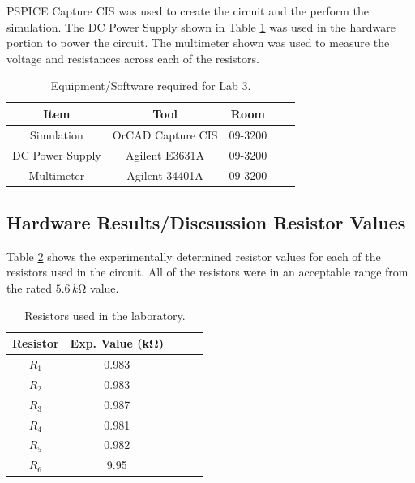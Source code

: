 \documentclass[11pt]{article}
\begin{document}
PSPICE Capture CIS was used to create the circuit and the perform the simulation. The DC Power Supply shown in Table \ref{Table:Equipment} was used in the hardware portion to power the circuit. The multimeter shown was used to measure the voltage and resistances across each of the resistors.

\begin{table}[htbp]
	\setlength{\tabcolsep}{14pt}
	\caption{Equipment/Software required for Lab 3.}
	\label{Table:Equipment}
	\begin{center}
		\begin{tabular}{|c||c|c|c|c|}
			\hline
			Item & Tool & Room      \\
			\hline
			Simulation & OrCAD Capture CIS & 09-3200   \\
			\hline  
			DC Power Supply & Agilent E3631A   & 09-3200 \\ 
			\hline 
			Multimeter & Agilent 34401A & 09-3200 \\
			\hline
		\end{tabular}
	\end{center}
\end{table}

\subsection{Hardware Results/Discsussion Resistor Values}	

Table \ref{Table:Lab3Resistors} shows the experimentally determined resistor values for each of the resistors used in the circuit. All of the resistors were in an acceptable range from the rated $5.6\,k\si\ohm$ value.

  	\begin{table}[h!]
  		\centering
  		\caption{Resistors used in the laboratory.}
  		\label{Table:Lab3Resistors}
  		\begin{tabular}{|c||c|c|c|c|}
  			\hline
  			Resistor &Exp. Value (\si{\kilo\ohm})  \\
  			\hline
  			$R_{1}$  & 0.983 \\	 \hline 
  			$R_{2}$  & 0.983 \\	 \hline 
  			$R_{3}$  & 0.987 \\	 \hline 
  			$R_{4}$  & 0.981 \\	 \hline 
  			$R_{5}$  & 0.982 \\	 \hline 
  			$R_{6}$  & 9.95 \\	 \hline
  		\end{tabular}
  	\end{table}
\end{document}
